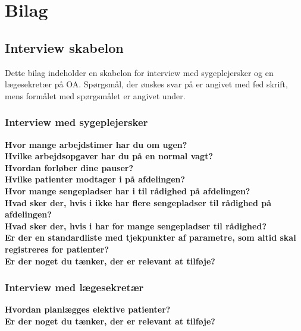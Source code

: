 \chapter{Bilag}

\section{Interview skabelon} \label{bilagA}
Dette bilag indeholder en skabelon for interview med sygeplejersker og en lægesekretær på OA. Spørgsmål, der ønskes svar på er angivet med fed skrift, mens formålet med spørgsmålet er angivet under. 

\subsection{Interview med sygeplejersker}
\textbf{Hvor mange arbejdstimer har du om ugen?} \\
\noindent
\textbf{Hvilke arbejdsopgaver har du på en normal vagt?} \\
\noindent
\textbf{Hvordan forløber dine pauser?} \\
\noindent
\textbf{Hvilke patienter modtager i på afdelingen?} \\
\noindent
\textbf{Hvor mange sengepladser har i til rådighed på afdelingen?}  \\
\noindent
\textbf{Hvad sker der, hvis i ikke har flere sengepladser til rådighed på afdelingen?} \\
\noindent
\textbf{Hvad sker der, hvis i har for mange sengepladser til rådighed?} \\
\noindent
\textbf{Er der en standardliste med tjekpunkter af parametre, som altid skal registreres for patienter?} \\
\noindent
\textbf{Er der noget du tænker, der er relevant at tilføje?} \\

\subsection{Interview med lægesekretær}
\textbf{Hvordan planlægges elektive patienter?} \\
\noindent
\textbf{Er der noget du tænker, der er relevant at tilføje?} \\




